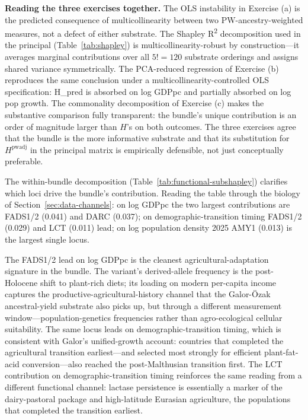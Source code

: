 \documentclass[11pt,letterpaper]{article}
\begin{document}
\textbf{Reading the three exercises together.}
The OLS instability in Exercise (a) is the predicted consequence of multicollinearity between two PW-ancestry-weighted measures, not a defect of either substrate. The Shapley R\textsuperscript{2} decomposition used in the principal (Table~\ref{tab:shapley}) is multicollinearity-robust by construction—it averages marginal contributions over all $5! = 120$ substrate orderings and assigns shared variance symmetrically. The PCA-reduced regression of Exercise (b) reproduces the same conclusion under a multicollinearity-controlled OLS specification: H\_pred is absorbed on log GDPpc and partially absorbed on log pop growth. The commonality decomposition of Exercise (c) makes the substantive comparison fully transparent: the bundle's unique contribution is an order of magnitude larger than $H$'s on both outcomes. The three exercises agree that the bundle is the more informative substrate and that its substitution for $H^{\text{pwadj}}$ in the principal matrix is empirically defensible, not just conceptually preferable.

The within-bundle decomposition (Table~\ref{tab:functional-subshapley}) clarifies which loci drive the bundle's contribution. Reading the table through the biology of Section~\ref{sec:data-channels}: on log GDPpc the two largest contributions are FADS1/2 (0.041) and DARC (0.037); on demographic-transition timing FADS1/2 (0.029) and LCT (0.011) lead; on log population density 2025 AMY1 (0.013) is the largest single locus.

The FADS1/2 lead on log GDPpc is the cleanest agricultural-adaptation signature in the bundle. The variant's derived-allele frequency is the post-Holocene shift to plant-rich diets; its loading on modern per-capita income captures the productive-agricultural-history channel that the Galor-\"Ozak ancestral-yield substrate also picks up, but through a different measurement window---population-genetics frequencies rather than agro-ecological cellular suitability. The same locus leads on demographic-transition timing, which is consistent with Galor's unified-growth account: countries that completed the agricultural transition earliest---and selected most strongly for efficient plant-fat-acid conversion---also reached the post-Malthusian transition first. The LCT contribution on demographic-transition timing reinforces the same reading from a different functional channel: lactase persistence is essentially a marker of the dairy-pastoral package and high-latitude Eurasian agriculture, the populations that completed the transition earliest.
\end{document}
